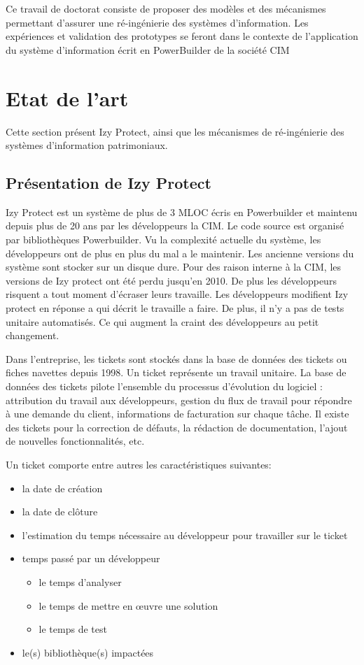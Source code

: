 \documentclass[a4paper]{article}
\begin{document}
Ce travail de doctorat consiste de proposer des modèles et des mécanismes permettant d'assurer
une ré-ingénierie des systèmes d'information. Les expériences et validation des prototypes se feront dans le contexte de l'application du système d'information écrit en PowerBuilder de la société CIM
\section{Etat de l'art}
\label{sec:stateOfTheArt}

Cette section présent Izy Protect, ainsi que les mécanismes de ré-ingénierie des systèmes d'information patrimoniaux.
\subsection{Présentation de Izy Protect}
\label{sec:izyProtect}
Izy Protect est un système de plus de 3 MLOC écris en Powerbuilder et maintenu depuis plus de 20 ans par les développeurs la CIM. Le code source est organisé par bibliothèques Powerbuilder.
Vu la complexité actuelle du système, les développeurs ont de plus en plus du mal a le maintenir. Les ancienne versions du système sont stocker sur un disque dure. Pour des raison interne à la CIM, les versions de Izy protect ont été perdu jusqu'en 2010.  De plus les développeurs risquent a tout moment d'écraser leurs travaille. Les développeurs modifient Izy protect en réponse a qui décrit le travaille a faire. 
De plus, il n'y a pas de tests unitaire automatisés.
Ce qui augment la craint des développeurs au petit changement.

Dans l'entreprise, les tickets sont stockés dans la base de données des tickets ou fiches navettes depuis 1998. 
Un ticket représente un travail unitaire.
La base de données des tickets pilote l'ensemble du processus d'évolution du logiciel : attribution du travail aux développeurs, gestion du flux de travail pour répondre à une demande du client, informations de facturation sur chaque tâche.
Il existe des tickets pour la correction de défauts, la rédaction de documentation, l'ajout de nouvelles fonctionnalités, etc. 

Un ticket comporte entre autres les caractéristiques suivantes:

\begin{itemize}
\item  la date de création
\item la date de clôture
\item l'estimation du temps nécessaire au développeur pour travailler sur le ticket
\item temps passé par un développeur
  \begin{itemize}
  \item le temps d'analyser
  \item le temps de mettre en œuvre une solution
  \item le temps de test
  \end{itemize}
  \item le(s) bibliothèque(s) impactées
\end{itemize}
\end{document}
